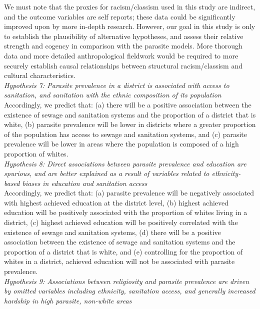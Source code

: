 \documentclass[12pt]{article}
\begin{document}
	We must note that the proxies for racism/classism used in this study are indirect, and the outcome variables are self reports; these data could be significantly improved upon by more in-depth research. However, our goal in this study is only to establish the plausibility of alternative hypotheses, and assess their relative strength and cogency in comparison with the parasite models.  More thorough data and more detailed anthropological fieldwork would be required to more securely establish causal relationships between structural racism/classism and cultural characteristics. \\

\noindent\textit{Hypothesis 7: Parasite prevalence in a district is associated with access to sanitation, and sanitation with the ethnic composition of its population}\\

Accordingly, we predict that: (a) there will be a positive association between the existence of sewage and sanitation systems and the proportion of a district that is white, (b) parasite prevalence will be lower in districts where a greater proportion of the population has access to sewage and sanitation systems, and (c) parasite prevalence will be lower in areas where the population is composed of a high proportion of whites.\\

\noindent\textit{Hypothesis 8: Direct associations between parasite prevalence and education are spurious, and are better explained as a result of variables related to ethnicity-based biases in education and sanitation access}\\

 Accordingly, we predict that: (a) parasite prevalence will be negatively associated with highest achieved education at the district level, (b) highest achieved education will be positively associated with the proportion of whites living in a district, (c) highest achieved education will be positively correlated with the existence of sewage and sanitation systems, (d) there will be a positive association between the existence of sewage and sanitation systems and the proportion of a district that is white, and (e)  controlling for the proportion of whites in a district, achieved education will not be associated with parasite prevalence.\\

\noindent\textit{Hypothesis 9: Associations between religiosity and parasite prevalence are driven by omitted variables including ethnicity, sanitation access, and generally increased hardship in high parasite, non-white areas }\\
\end{document}
